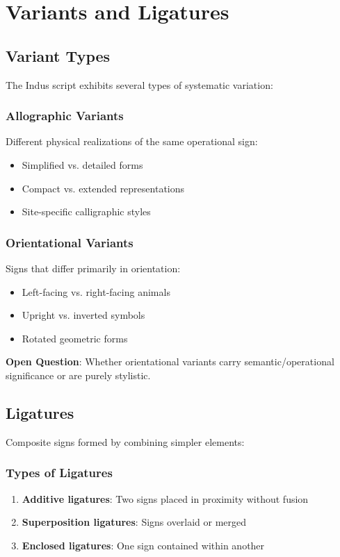 \section{Variants and Ligatures}

\subsection{Variant Types}

The Indus script exhibits several types of systematic variation:

\subsubsection{Allographic Variants}
Different physical realizations of the same operational sign:
\begin{itemize}
    \item Simplified vs. detailed forms
    \item Compact vs. extended representations
    \item Site-specific calligraphic styles
\end{itemize}

\subsubsection{Orientational Variants}
Signs that differ primarily in orientation:
\begin{itemize}
    \item Left-facing vs. right-facing animals
    \item Upright vs. inverted symbols
    \item Rotated geometric forms
\end{itemize}

\textbf{Open Question}: Whether orientational variants carry semantic/operational significance or are purely stylistic.

\subsection{Ligatures}

Composite signs formed by combining simpler elements:

\subsubsection{Types of Ligatures}
\begin{enumerate}
    \item \textbf{Additive ligatures}: Two signs placed in proximity without fusion
    \item \textbf{Superposition ligatures}: Signs overlaid or merged
    \item \textbf{Enclosed ligatures}: One sign contained within another
\end{enumerate}

